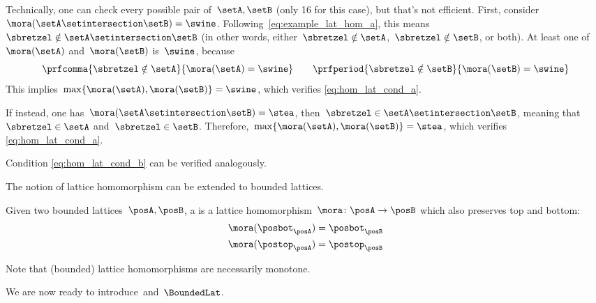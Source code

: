 \begin{example}
    Technically, one can check every possible pair of~$\setA,\setB$ (only 16 for this case), but that's not efficient.
    First, consider~$\mora(\setA\setintersection \setB)=\swine$.
    Following~\cref{eq:example_lat_hom_a}, this means~$\sbretzel \notin \setA\setintersection \setB$ (in other words, either~$\sbretzel \notin \setA$,~$\sbretzel \notin \setB$, or both).
    At least one of~$\mora(\setA)$ and~$\mora(\setB)$ is~$\swine$, because
    \begin{equation*}
        \prfcomma{\sbretzel \notin \setA}{\mora(\setA)=\swine} \qquad
        \prfperiod{\sbretzel \notin \setB}{\mora(\setB)=\swine}
    \end{equation*}
    This implies~$\max\{\mora(\setA),\mora(\setB)\}=\swine$, which verifies \cref{eq:hom_lat_cond_a}.

    If instead, one has~$\mora(\setA\setintersection \setB)=\stea$, then~$\sbretzel \in \setA\setintersection \setB$, meaning that~$\sbretzel \in \setA$ and~$\sbretzel \in \setB$.
    Therefore,~$\max\{ \mora(\setA),\mora(\setB)\}=\stea$, which verifies \cref{eq:hom_lat_cond_a}.

    Condition \cref{eq:hom_lat_cond_b} can be verified analogously.
\end{example}

The notion of lattice homomorphism can be extended to bounded lattices.

\begin{ctdefinition}
    \label{def:bounded_lat_homomorphism}
    Given two bounded lattices~$\posA,\posB$, a \emph{} is a lattice homomorphism~$\mora\colon \posA\to \posB$ which also preserves top and bottom:
    \begin{equation}
        \begin{aligned}
            \mora(\posbot_\posA) & =\posbot_\posB \\
            \mora(\postop_\posA) & =\postop_\posB
        \end{aligned}
    \end{equation}
\end{ctdefinition}

Note that (bounded) lattice homomorphisms are necessarily monotone.

We are now ready to introduce~\Lat and~$\BoundedLat$.

